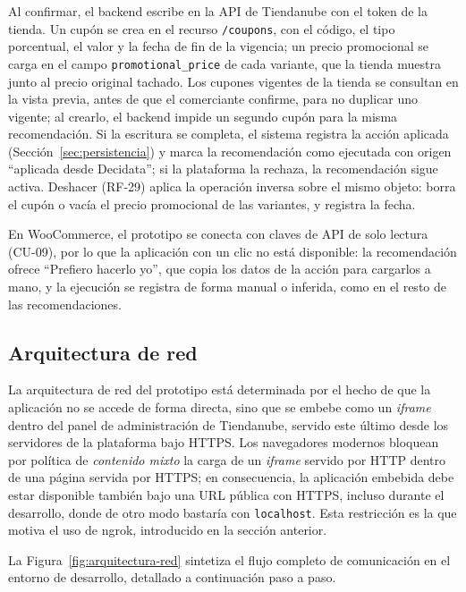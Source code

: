Al confirmar, el backend escribe en la API de Tiendanube con el token de la tienda. Un cupón se crea en el recurso \texttt{/coupons}, con el código, el tipo porcentual, el valor y la fecha de fin de la vigencia; un precio promocional se carga en el campo \texttt{promotional\_price} de cada variante, que la tienda muestra junto al precio original tachado. Los cupones vigentes de la tienda se consultan en la vista previa, antes de que el comerciante confirme, para no duplicar uno vigente; al crearlo, el backend impide un segundo cupón para la misma recomendación. Si la escritura se completa, el sistema registra la acción aplicada (Sección~\ref{sec:persistencia}) y marca la recomendación como ejecutada con origen \enquote{aplicada desde Decidata}; si la plataforma la rechaza, la recomendación sigue activa. Deshacer (RF-29) aplica la operación inversa sobre el mismo objeto: borra el cupón o vacía el precio promocional de las variantes, y registra la fecha.

En WooCommerce, el prototipo se conecta con claves de API de solo lectura (CU-09), por lo que la aplicación con un clic no está disponible: la recomendación ofrece \enquote{Prefiero hacerlo yo}, que copia los datos de la acción para cargarlos a mano, y la ejecución se registra de forma manual o inferida, como en el resto de las recomendaciones.

\subsection{Arquitectura de red}
\label{sec:arquitectura-red}

La arquitectura de red del prototipo está determinada por el hecho de que la aplicación no se accede de forma directa, sino que se embebe como un \emph{iframe} dentro del panel de administración de Tiendanube, servido este último desde los servidores de la plataforma bajo HTTPS. Los navegadores modernos bloquean por política de \emph{contenido mixto} la carga de un \emph{iframe} servido por HTTP dentro de una página servida por HTTPS; en consecuencia, la aplicación embebida debe estar disponible también bajo una URL pública con HTTPS, incluso durante el desarrollo, donde de otro modo bastaría con \texttt{localhost}. Esta restricción es la que motiva el uso de ngrok, introducido en la sección anterior.

La Figura~\ref{fig:arquitectura-red} sintetiza el flujo completo de comunicación en el entorno de desarrollo, detallado a continuación paso a paso.


